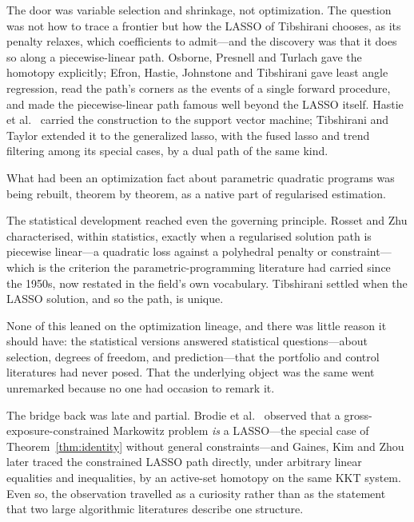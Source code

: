 The door was variable selection and shrinkage, not optimization. The question was not how
to trace a frontier but how the LASSO of Tibshirani \cite{tibshirani1996} chooses, as its
penalty relaxes, which coefficients to admit---and the discovery was that it does so
along a piecewise-linear path. Osborne, Presnell and Turlach \cite{osborne2000} gave the
homotopy explicitly; Efron, Hastie, Johnstone and Tibshirani \cite{efron2004} gave least
angle regression, read the path's corners as the events of a single forward procedure,
and made the piecewise-linear path famous well beyond the LASSO itself. Hastie et al.\
\cite{hastie2004svm} carried the construction to the support vector machine; Tibshirani
and Taylor \cite{tibshirani2011} extended it to the generalized lasso, with the fused
lasso and trend filtering among its special cases, by a dual path of the same kind.

What had been an optimization fact about parametric quadratic programs was being rebuilt,
theorem by theorem, as a native part of regularised estimation.

The statistical development reached even the governing principle. Rosset and Zhu
\cite{rosset2007} characterised, within statistics, exactly when a regularised solution
path is piecewise linear---a quadratic loss against a polyhedral penalty or
constraint---which is the criterion the parametric-programming literature had carried
since the 1950s, now restated in the field's own vocabulary. Tibshirani
\cite{tibshirani2013} settled when the LASSO solution, and so the path, is unique.

None of this leaned on the optimization lineage, and there was little reason it should
have: the statistical versions answered statistical questions---about selection, degrees
of freedom, and prediction---that the portfolio and control literatures had never posed.
That the underlying object was the same went unremarked because no one had occasion to
remark it.

The bridge back was late and partial. Brodie et al.\ \cite{brodie2009} observed that a
gross-exposure-constrained Markowitz problem \emph{is} a LASSO---the special case of
Theorem~\ref{thm:identity} without general constraints---and Gaines, Kim and Zhou
\cite{gaines2018} later traced the constrained LASSO path directly, under arbitrary
linear equalities and inequalities, by an active-set homotopy on the same KKT system.
Even so, the observation travelled as a curiosity rather than as the statement that two
large algorithmic literatures describe one structure.

